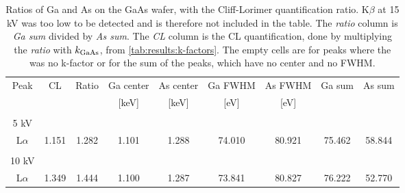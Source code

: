 \begin{table}[ht]
    \centering
    \caption{
        Ratios of Ga and As on the GaAs wafer, with the Cliff-Lorimer quantification ratio.
        K$\beta$ at 15 kV was too low to be detected and is therefore not included in the table.
        The \emph{ratio} column is \emph{Ga sum} divided by \emph{As sum}.
        The \emph{CL} column is the CL quantification, done by multiplying the \emph{ratio} with $k_\textnormal{GaAs}$, from \cref{tab:results:k-factors}.
        The empty cells are for peaks where the was no k-factor or for the sum of the peaks, which have no center and no FWHM.
    }
    \label{tab:results:ratios}
    \begin{tabular}{ccccccccc}

        Peak                         & CL    & Ratio & Ga center & As center & Ga FWHM & As FWHM & Ga sum  & As sum \\
                                     &       &       & [keV]     & [keV]     & [eV]    & [eV]    &         &        \\
        \hline
                                     &       &       &           &           &         &         &         &        \\

        5 kV                         &       &       &           &           &         &         &         &        \\
        L$\alpha$                    & 1.151 & 1.282 & 1.101     & 1.288     & 74.010  & 80.921  & 75.462  & 58.844 \\
        \hline
                                     &       &       &           &           &         &         &         &        \\
        10 kV                        &       &       &           &           &         &         &         &        \\
        L$\alpha$                    & 1.349 & 1.444 & 1.100     & 1.287     & 73.841  & 80.827  & 76.222  & 52.770 \\


\end{tabular}
\end{table}
